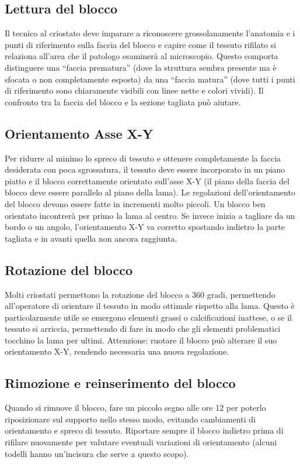 \subsection{Lettura del blocco}
Il tecnico al criostato deve imparare a riconoscere grossolanamente l'anatomia e i punti di riferimento sulla faccia del blocco e capire come il tessuto rifilato si relaziona all'area che il patologo esaminerà al microscopio. Questo comporta distinguere una ``faccia prematura'' (dove la struttura sembra presente ma è sfocata o non completamente esposta) da una ``faccia matura'' (dove tutti i punti di riferimento sono chiaramente visibili con linee nette e colori vividi). Il confronto tra la faccia del blocco e la sezione tagliata può aiutare. 

\subsection{Orientamento Asse X-Y}
Per ridurre al minimo lo spreco di tessuto e ottenere completamente la faccia desiderata con poca sgrossatura, il tessuto deve essere incorporato in un piano piatto e il blocco correttamente orientato sull'asse X-Y (il piano della faccia del blocco deve essere parallelo al piano della lama).
Le regolazioni dell'orientamento del blocco devono essere fatte in incrementi molto piccoli. Un blocco ben orientato incontrerà per primo la lama al centro. Se invece inizia a tagliare da un bordo o un angolo, l'orientamento X-Y va corretto spostando indietro la parte tagliata e in avanti quella non ancora raggiunta. 

\subsection{Rotazione del blocco}
Molti criostati permettono la rotazione del blocco a 360 gradi, permettendo all'operatore di orientare il tessuto in modo ottimale rispetto alla lama. Questo è particolarmente utile se emergono elementi grassi o calcificazioni inattese, o se il tessuto si arriccia, permettendo di fare in modo che gli elementi problematici tocchino la lama per ultimi. Attenzione: ruotare il blocco può alterare il suo orientamento X-Y, rendendo necessaria una nuova regolazione.

\subsection{Rimozione e reinserimento del blocco}
Quando si rimuove il blocco, fare un piccolo segno alle ore 12 per poterlo riposizionare sul supporto nello stesso modo, evitando cambiamenti di orientamento e spreco di tessuto. Riportare sempre il blocco indietro prima di rifilare nuovamente per valutare eventuali variazioni di orientamento (alcuni todelli hanno un'incisura che serve a questo scopo).

